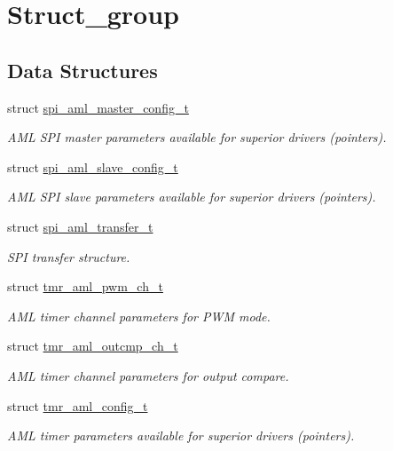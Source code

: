 \hypertarget{group__struct__group}{}\section{Struct\+\_\+group}
\label{group__struct__group}
\subsection*{Data Structures}
\begin{DoxyCompactItemize}
\item 
struct \mbox{\hyperlink{structspi__aml__master__config__t}{spi\+\_\+aml\+\_\+master\+\_\+config\+\_\+t}}
\begin{DoxyCompactList}\small\item\em A\+ML S\+PI master parameters available for superior drivers (pointers). \end{DoxyCompactList}\item 
struct \mbox{\hyperlink{structspi__aml__slave__config__t}{spi\+\_\+aml\+\_\+slave\+\_\+config\+\_\+t}}
\begin{DoxyCompactList}\small\item\em A\+ML S\+PI slave parameters available for superior drivers (pointers). \end{DoxyCompactList}\item 
struct \mbox{\hyperlink{structspi__aml__transfer__t}{spi\+\_\+aml\+\_\+transfer\+\_\+t}}
\begin{DoxyCompactList}\small\item\em S\+PI transfer structure. \end{DoxyCompactList}\item 
struct \mbox{\hyperlink{structtmr__aml__pwm__ch__t}{tmr\+\_\+aml\+\_\+pwm\+\_\+ch\+\_\+t}}
\begin{DoxyCompactList}\small\item\em A\+ML timer channel parameters for P\+WM mode. \end{DoxyCompactList}\item 
struct \mbox{\hyperlink{structtmr__aml__outcmp__ch__t}{tmr\+\_\+aml\+\_\+outcmp\+\_\+ch\+\_\+t}}
\begin{DoxyCompactList}\small\item\em A\+ML timer channel parameters for output compare. \end{DoxyCompactList}\item 
struct \mbox{\hyperlink{structtmr__aml__config__t}{tmr\+\_\+aml\+\_\+config\+\_\+t}}
\begin{DoxyCompactList}\small\item\em A\+ML timer parameters available for superior drivers (pointers). \end{DoxyCompactList}\item 

\end{DoxyCompactItemize}
